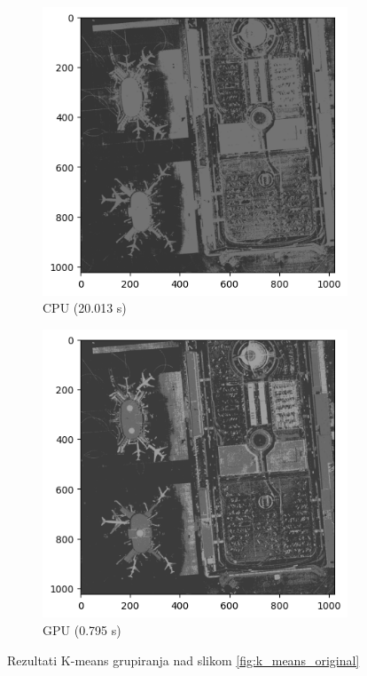 \documentclass[a4paper,twocolumn]{article}
\begin{document}
        \begin{figure}[hbt]
        	\centering
        	\begin{subfigure}[]{0.49\linewidth}
        		\includegraphics[width=1\linewidth]{slike/k_means_cpu.png}
        		\caption{CPU (20.013 s)}
        		
        	\end{subfigure}
        	\begin{subfigure}[]{0.49\linewidth}
        		\includegraphics[width=1\linewidth]{slike/k_means_gpu.png}
        		\caption{GPU (0.795 s)}
        		
        	\end{subfigure}
        	\caption{Rezultati K-means grupiranja nad slikom \ref{fig:k_means_original}}
        	\label{fig:k_means_CPU_GPU}
        \end{figure}
        
\end{document}
